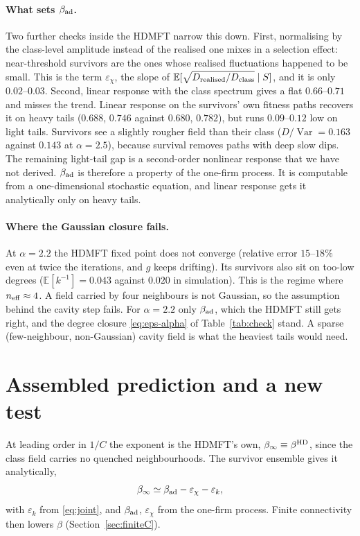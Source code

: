 \documentclass[11pt]{article}
\newcommand{\E}{\mathbb E}
\newcommand{\Var}{\operatorname{Var}}
\theoremstyle{remark}
\begin{document}
\paragraph{What sets $\beta_{\rm ad}$.}
Two further checks inside the HDMFT narrow this down.  First, normalising by the class-level
amplitude instead of the realised one mixes in a selection effect: near-threshold survivors are
the ones whose realised fluctuations happened to be small.  This is the term $\varepsilon_\chi$,
the slope of $\E[\sqrt{D_{\rm realised}/D_{\rm class}}\mid S]$, and it is only $0.02$--$0.03$.
Second, linear response with the class
spectrum gives a flat $0.66$--$0.71$ and misses the trend.  Linear response on the survivors'
own fitness paths recovers it on heavy tails ($0.688$, $0.746$ against $0.680$, $0.782$), but runs
$0.09$--$0.12$ low on light tails.  Survivors see a slightly rougher field than their class
($D/\Var=0.163$ against $0.143$ at $\alpha=2.5$), because survival removes paths with deep slow
dips.  The remaining light-tail gap is a second-order nonlinear response that we have not
derived.  $\beta_{\rm ad}$ is therefore a property of the one-firm process.  It is computable from
a one-dimensional stochastic equation, and linear response gets it analytically only on heavy
tails.

\paragraph{Where the Gaussian closure fails.}
At $\alpha=2.2$ the HDMFT fixed point does not converge (relative error $15$--$18\%$ even at
twice the iterations, and $g$ keeps drifting).  Its survivors also sit on too-low degrees
($\E[k^{-1}]=0.043$ against $0.020$ in simulation).  This is the regime where
$n_{\rm eff}\approx4$.  A field carried by four neighbours is not Gaussian, so the assumption
behind the cavity step fails.  For $\alpha=2.2$ only $\beta_{\rm ad}$, which the HDMFT still
gets right, and the degree closure \eqref{eq:eps-alpha} of Table~\ref{tab:check} stand.  A
sparse (few-neighbour, non-Gaussian) cavity field is what the heaviest tails would
need.

\section{Assembled prediction and a new test}
\label{sec:assembled}

At leading order in $1/C$ the exponent is the HDMFT's own, $\beta_\infty\equiv\beta^{\rm HD}$,
since the class field carries no quenched neighbourhoods.  The survivor ensemble gives it
analytically,
\begin{equation}
  \beta_\infty\simeq\beta_{\rm ad}-\varepsilon_\chi-\varepsilon_k,
  \label{eq:beta-inf}
\end{equation}
with $\varepsilon_k$ from \eqref{eq:joint}, and $\beta_{\rm ad}$, $\varepsilon_\chi$ from the
one-firm process.  Finite connectivity then lowers $\beta$ (Section~\ref{sec:finiteC}).
\end{document}
